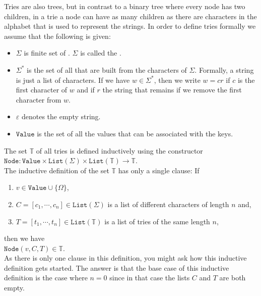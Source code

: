 Tries are also trees, but in contrast to a binary tree where every node has two children, in a trie a
node can have as many children as there are characters in the alphabet that is used to represent the
strings.  In order to define tries formally we assume that the following is given:
\begin{itemize}
\item $\Sigma$ is finite set of . $\Sigma$ is called the
      . 
\item $\Sigma^*$ is the set of all  that are built from the characters of $\Sigma$.
      Formally, a string is just a list of characters.  If we have $w \in \Sigma^*$, then we write $w = cr$
      if $c$ is the first character of $w$ and if $r$ the string that remains if we remove the first
      character from $w$.
\item $\varepsilon$ denotes the empty string.
\item $\texttt{Value}$ is the set of all the values that can be associated with the keys.  
\end{itemize}
The set $\mathbb{T}$ of all tries is defined inductively using the constructor \\[0.2cm]
\hspace*{1.3cm} 
$\texttt{Node}: \texttt{Value} \times \texttt{List}(\Sigma) \times
\texttt{List}(\mathbb{T}) \rightarrow \mathbb{T}$. 
\\[0.2cm]
The inductive definition of the set $\mathbb{T}$ has only a single clause: If
\begin{enumerate}
\item $v \in \texttt{Value} \cup \{\Omega\}$,
\item $C = [c_1, \cdots, c_n] \in \texttt{List}(\Sigma)$ is a list of different characters of length
      $n$ and,
\item $T = [t_1, \cdots, t_n] \in \texttt{List}(\mathbb{T})$ is a list of  tries of the same length $n$, 
\end{enumerate}
then we have 
\\[0.2cm]
\hspace*{1.3cm}  $\texttt{Node}(v, C, T) \in \mathbb{T}$.  
\\[0.2cm]
As there is only one clause in this definition, you might ask how this inductive definition gets started.
The answer is that the base case of this inductive definition is the case where
$n=0$ since in that case the lists  $C$ and $T$ are both empty.

